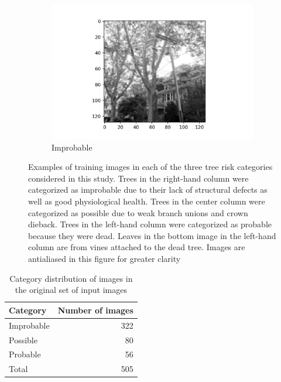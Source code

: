 \documentclass[Journal,letterpaper, SingleSpace, InsideFigs]{ascelike-new}
\begin{document}
\begin{figure}[ht]
\begin{subfigure}[t]{.32\linewidth}
    \includegraphics[width=\textwidth,angle=-90]{improbable-example-2}
    \caption{Improbable}
  \end{subfigure}
  \caption{Examples of training images in each of the three tree risk categories considered in this study.
  Trees in the right-hand column were categorized as improbable due to their lack of structural defects as well as good physiological health. Trees in the center column were categorized as possible due to weak branch unions and crown dieback. Trees in the left-hand column were categorized as probable because they were dead. Leaves in the bottom image in the left-hand column are from vines attached to the dead tree. Images are antialiased in this figure for greater clarity}
  \label{fig:raw_images}
\end{figure}

\begin{table}[h!]\small
    \centering
    \begin{tabular}{l r}\toprule
    \bf Category     & \bf Number of images  \\ \midrule
    Improbable & 322\\
    Possible & 80 \\
    Probable & 56 \\\midrule
    Total & 505 \\\bottomrule
    \end{tabular}
    \caption{Category distribution of images in the original set of input images}
    \label{tab:classdist}
\end{table}
\end{document}
